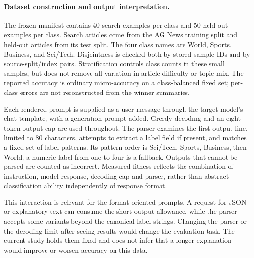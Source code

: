 \paragraph{Dataset construction and output interpretation.}
The frozen manifest contains 40 search examples per class and 50 held-out examples
per class. Search articles come from the AG News training split and held-out
articles from its test split. The four class names are World, Sports, Business,
and Sci/Tech. Disjointness is checked both by stored sample IDs and by
source-split/index pairs. Stratification controls class counts in these small
samples, but does not remove all variation in article difficulty or topic mix.
The reported accuracy is ordinary micro-accuracy on a class-balanced fixed set;
per-class errors are not reconstructed from the winner summaries.

Each rendered prompt is supplied as a user message through the target model's
chat template, with a generation prompt added. Greedy decoding and an eight-token
output cap are used throughout. The parser examines the first output line,
limited to 80 characters, attempts to extract a label field if present, and
matches a fixed set of label patterns. Its pattern order is Sci/Tech, Sports,
Business, then World; a numeric label from one to four is a fallback. Outputs
that cannot be parsed are counted as incorrect. Measured fitness
reflects the combination of instruction, model response, decoding cap and parser,
rather than abstract classification ability independently of response format.

This interaction is relevant for the format-oriented prompts. A request for JSON
or explanatory text can consume the short output allowance, while the parser
accepts some variants beyond the canonical label strings. Changing the parser or
the decoding limit after seeing results would change the evaluation task. The
current study holds them fixed and does not infer that a longer explanation
would improve or worsen accuracy on this data.
